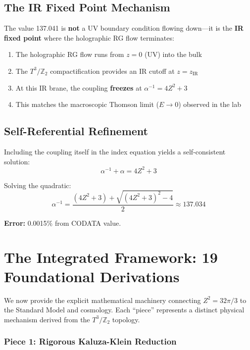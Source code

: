 \documentclass[12pt,a4paper]{article}
\newcommand{\Ztwo}{\mathbb{Z}_2}
\newcommand{\Tthree}{T^3}
\newcommand{\Zsq}{Z^2}
\begin{document}
\subsection{The IR Fixed Point Mechanism}

The value 137.041 is \textbf{not} a UV boundary condition flowing down---it is the \textbf{IR fixed point} where the holographic RG flow terminates:
\begin{enumerate}
    \item The holographic RG flow runs from $z = 0$ (UV) into the bulk
    \item The $T^3/\Ztwo$ compactification provides an IR cutoff at $z = z_{\text{IR}}$
    \item At this IR brane, the coupling \textbf{freezes} at $\alpha^{-1} = 4\Zsq + 3$
    \item This matches the macroscopic Thomson limit ($E \to 0$) observed in the lab
\end{enumerate}

\subsection{Self-Referential Refinement}

Including the coupling itself in the index equation yields a self-consistent solution:
\begin{equation}
\alpha^{-1} + \alpha = 4\Zsq + 3
\end{equation}

Solving the quadratic:
\begin{equation}
\alpha^{-1} = \frac{(4\Zsq + 3) + \sqrt{(4\Zsq + 3)^2 - 4}}{2} \approx 137.034
\end{equation}

\textbf{Error:} 0.0015\% from CODATA value.

\section{The Integrated Framework: 19 Foundational Derivations}
\label{sec:framework}

We now provide the explicit mathematical machinery connecting $\Zsq = 32\pi/3$ to the Standard Model and cosmology. Each ``piece'' represents a distinct physical mechanism derived from the $\Tthree/\Ztwo$ topology.

\subsubsection{Piece 1: Rigorous Kaluza-Klein Reduction}
\end{document}
